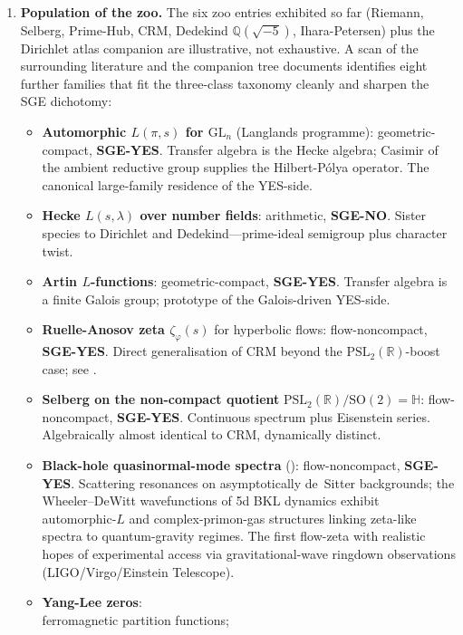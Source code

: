 \documentclass[11pt]{article}
\theoremstyle{definition}
\theoremstyle{remark}
\newcommand{\PSL}{\mathrm{PSL}}
\begin{document}
\begin{enumerate}
\item \textbf{Population of the zoo.} The six zoo entries exhibited
  so far (Riemann, Selberg, Prime-Hub, CRM, Dedekind
  $\mathbb{Q}(\sqrt{-5})$, Ihara-Petersen) plus the Dirichlet atlas
  companion \cite{DirichletAtlas} are illustrative, not exhaustive.
  A scan of the surrounding literature and the companion tree
  documents \cite{CandidatesMasterList} identifies eight further
  families that fit the three-class taxonomy cleanly and sharpen
  the SGE dichotomy:
  \begin{itemize}
  \item \textbf{Automorphic $L(\pi, s)$ for $\mathrm{GL}_n$}
  (Langlands programme): geometric-compact, \textbf{SGE-YES}.
  Transfer algebra is the Hecke algebra; Casimir of the ambient
  reductive group supplies the Hilbert-P\'olya operator. The
  canonical large-family residence of the YES-side.
  \item \textbf{Hecke $L(s, \lambda)$ over number fields}:
  arithmetic, \textbf{SGE-NO}. Sister species to Dirichlet and
  Dedekind---prime-ideal semigroup plus character twist.
  \item \textbf{Artin $L$-functions}: geometric-compact,
  \textbf{SGE-YES}. Transfer algebra is a finite Galois group;
  prototype of the Galois-driven YES-side.
  \item \textbf{Ruelle-Anosov zeta $\zeta_\varphi(s)$} for hyperbolic
  flows: flow-noncompact, \textbf{SGE-YES}. Direct generalisation
  of CRM beyond the $\PSL_2(\mathbb{R})$-boost case; see
  \cite{DyatlovZworski2019}.
  \item \textbf{Selberg on the non-compact quotient}
  $\mathrm{PSL}_2(\mathbb{R})/\mathrm{SO}(2) = \mathbb{H}$:
  flow-noncompact, \textbf{SGE-YES}. Continuous spectrum plus
  Eisenstein series. Algebraically almost identical to CRM,
  dynamically distinct.
  \item \textbf{Black-hole quasinormal-mode spectra}
  (\cite{DeClerckHartnollYang2025}): flow-noncompact,
  \textbf{SGE-YES}. Scattering resonances on asymptotically
  de~Sitter backgrounds; the Wheeler--DeWitt wavefunctions of 5d
  BKL dynamics exhibit automorphic-$L$ and complex-primon-gas
  structures linking zeta-like spectra to quantum-gravity regimes.
  The first flow-zeta with realistic hopes of experimental access
  via gravitational-wave ringdown observations (LIGO/Virgo/Einstein
  Telescope).
  \item \textbf{Yang-Lee zeros}:\\[-0.6ex]
  ferromagnetic partition functions;

\end{itemize}
\end{enumerate}
\end{document}
